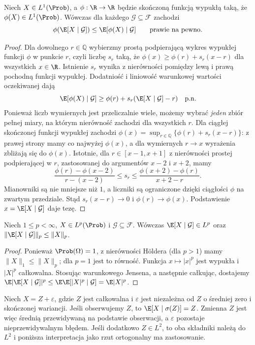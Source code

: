 \begin{twierdzenie}
Niech $X\in L^1(\Prob)$, a $\phi:\R\to\R$ będzie
skończoną funkcją wypukłą taką, że
$\phi(X)\in L^1(\Prob)$. Wówczas dla każdego
$\mathcal G\subseteq\mathcal F$
zachodzi
\[
\phi(\E[X\mid\mathcal G])
\leq\E[\phi(X)\mid\mathcal G]
\qquad\text{prawie na pewno}.
\]
\end{twierdzenie}
\begin{proof}
Dla dowolnego $r\in\mathbb Q$ wybierzmy prostą
podpierającą wykres wypukłej funkcji $\phi$ w punkcie
$r$, czyli liczbę $s_r$ taką, że
$\phi(x)\geq\phi(r)+s_r(x-r)$ dla wszystkich $x\in\R$.
Istnienie $s_r$ wynika z nierówności pomiędzy
lewą i prawą pochodną funkcji wypukłej.
Dodatniość i liniowość warunkowej wartości
oczekiwanej dają
\[
\E[\phi(X)\mid\mathcal G]
\geq\phi(r)+s_r(\E[X\mid\mathcal G]-r)
\quad\text{p.n.}
\]
Ponieważ liczb wymiernych jest przeliczalnie wiele,
możemy wybrać \emph{jeden} zbiór pełnej miary,
na którym nierówność zachodzi dla wszystkich $r$.
Dla ciągłej skończonej funkcji wypukłej zachodzi
$\phi(x)=\sup_{r\in\mathbb Q}\{\phi(r)+s_r(x-r)\}$:
z prawej strony mamy co najwyżej $\phi(x)$,
a dla wymiernych $r\to x$ wyrażenia zbliżają się
do $\phi(x)$. Istotnie, dla $r\in[x-1,x+1]$
z nierówności prostej podpierającej w $r$,
zastosowanej do argumentów $x-2$ i $x+2$, mamy
\[
\frac{\phi(r)-\phi(x-2)}{r-(x-2)}
\leq s_r\leq
\frac{\phi(x+2)-\phi(r)}{x+2-r}.
\]
Mianowniki są nie mniejsze niż $1$, a liczniki są
ograniczone dzięki ciągłości $\phi$ na zwartym
przedziale. Stąd $s_r(x-r)\to0$ i $\phi(r)\to\phi(x)$. Podstawienie
$x=\E[X\mid\mathcal G]$ daje tezę.
\end{proof}

\begin{wniosek}[Kontrakcja w $L^p$]
Niech $1\leq p<\infty$, $X\in L^p(\Prob)$ i
$\mathcal G\subseteq\mathcal F$. Wówczas
$\E[X\mid\mathcal G]\in L^p$ oraz
$\|\E[X\mid\mathcal G]\|_p\leq\|X\|_p$.
\end{wniosek}
\begin{proof}
Ponieważ $\Prob(\Omega)=1$, z nierówności Höldera
(dla $p>1$) mamy $\|X\|_1\leq\|X\|_p$; dla $p=1$
jest to równość. Funkcja $x\mapsto|x|^p$ jest wypukła
i $|X|^p$ całkowalna. Stosując warunkowego Jensena, a następnie całkując,
dostajemy
$\E|\E[X\mid\mathcal G]|^p\leq
\E\E[|X|^p\mid\mathcal G]=\E|X|^p$.
\end{proof}

\begin{przyklad}
Niech $X=Z+\varepsilon$, gdzie $Z$ jest całkowalna
i $\varepsilon$ jest niezależna od $Z$ o średniej
zero i skończonej wariancji. Jeśli obserwujemy $Z$,
to $\E[X\mid\sigma(Z)]=Z$. Zmienna $Z$ jest więc
średnią przewidywaną na podstawie obserwacji, a
$\varepsilon$ pozostaje nieprzewidywalnym błędem.
Jeśli dodatkowo $Z\in L^2$, to oba składniki należą
do $L^2$ i poniższa interpretacja jako rzut
ortogonalny ma zastosowanie.
\end{przyklad}

